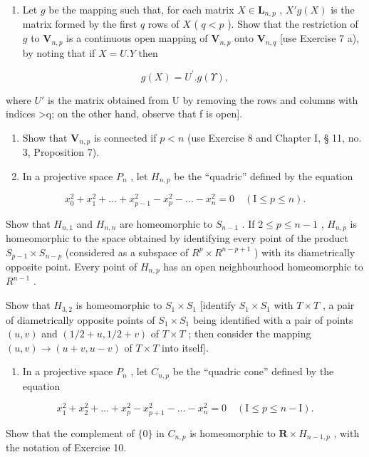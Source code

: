 \begin{enumerate}
\def\labelenumi{\arabic{enumi})}
\setcounter{enumi}{7}
\tightlist
\item
  Let \(g\) be the mapping such that, for each matrix \(X \in \mathbf{L}_{n,p}\) , \(X'g(X)\) is the matrix formed by the first \(q\) rows of \(X\) ( \(q < p\) ). Show that the restriction of \(g\) to \(\mathbf{V}_{n,p}\) is a continuous open mapping of \(\mathbf{V}_{n,p}\) onto \(\mathbf{V}_{n,q}\) {[}use Exercise 7 a), by noting that if \(X = U.Y\) then
\end{enumerate}

\[
g (X) = U ^ {\prime}. g (\Upsilon),
\]

where \(U'\) is the matrix obtained from U by removing the rows and columns with indices \textgreater q; on the other hand, observe that f is open{]}.

\begin{enumerate}
\def\labelenumi{\arabic{enumi})}
\setcounter{enumi}{8}
\item
  Show that \(\mathbf{V}_{n,p}\) is connected if \(p < n\) (use Exercise 8 and Chapter I, § 11, no. 3, Proposition 7).
\item
  In a projective space \(P_{n}\) , let \(H_{n,p}\) be the ``quadric'' defined by the equation
\end{enumerate}

\[
x _ {0} ^ {2} + x _ {1} ^ {2} + \dots + x _ {p - 1} ^ {2} - x _ {p} ^ {2} - \dots - x _ {n} ^ {2} = 0 \quad (\mathrm{I} \leqslant p \leqslant n).
\]

Show that \(H_{n,1}\) and \(H_{n,n}\) are homeomorphic to \(S_{n-1}\) . If \(2 \leqslant p \leqslant n - 1\) , \(H_{n,p}\) is homeomorphic to the space obtained by identifying every point of the product \(S_{p-1} \times S_{n-p}\) (considered as a subspace of \(R^{p} \times R^{n-p+1}\) ) with its diametrically opposite point. Every point of \(H_{n,p}\) has an open neighbourhood homeomorphic to \(R^{n-1}\) .

Show that \(H_{3,2}\) is homeomorphic to \(S_{1} \times S_{1}\) {[}identify \(S_{1} \times S_{1}\) with \(T \times T\) , a pair of diametrically opposite points of \(S_{1} \times S_{1}\) being identified with a pair of points \((u, v)\) and \((1/2 + u, 1/2 + v)\) of \(T \times T\) ; then consider the mapping \((u, v) \to (u + v, u - v)\) of \(T \times T\) into itself{]}.

\begin{enumerate}
\def\labelenumi{\arabic{enumi})}
\setcounter{enumi}{10}
\tightlist
\item
  In a projective space \(P_{n}\) , let \(C_{n,p}\) be the ``quadric cone'' defined by the equation
\end{enumerate}

\[
x _ {1} ^ {2} + x _ {2} ^ {2} + \dots + x _ {p} ^ {2} - x _ {p + 1} ^ {2} - \dots - x _ {n} ^ {2} = 0 \quad (\mathrm{I} \leqslant p \leqslant n - \mathrm{I}).
\]

Show that the complement of \(\{0\}\) in \(C_{n,p}\) is homeomorphic to \(\mathbf{R} \times H_{n-1,p}\) , with the notation of Exercise 10.

